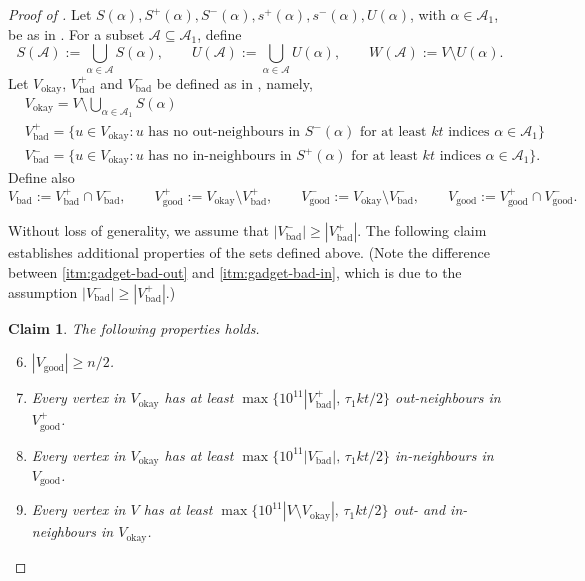 \documentclass[english]{article}
\theoremstyle{plain}
\newtheorem{claim}[theorem]{Claim}
\theoremstyle{remark}
\def \Sp {S^+}
\def \Sm {S^-}
\def \sp {s^+}
\def \smm {s^-}
\def \Vgp {V_{\good}^+}
\def \Vbp {V_{\bad}^+}
\def \Vbm {V_{\bad}^-}
\def \Vgp {V_{\good}^+}
\def \Vgm {V_{\good}^-}
\def \Vo {V_{\okay}}
\def \Vg {V_{\good}}
\def \Vb {V_{\bad}}
\def \Vgm {V_{\good}^-}
\newcommand{\A}{\mathcal{A}}
\DeclareMathOperator{\bad}{bad}
\DeclareMathOperator{\good}{good}
\DeclareMathOperator{\okay}{okay}
\begin{document}
\begin{proof}[Proof of ]
	Let $S(\alpha), \Sp(\alpha), \Sm(\alpha), \sp(\alpha), \smm(\alpha), U(\alpha)$, with $\alpha \in \A_1$, be as in . For a subset $\A \subseteq \A_1$, define
	\begin{equation*}
		S(\A) := \bigcup_{\alpha \in \A} S(\alpha), \qquad U(\A) := \bigcup_{\alpha \in \A} U(\alpha), \qquad W(\A) := V \setminus U(\alpha).
	\end{equation*}
	Let $\Vo$, $\Vbp$ and $\Vbm$ be defined as in , namely,
	\begin{align*}
		& \Vo = V \setminus \bigcup_{\alpha \in \A_1} S(\alpha) \\
		& \Vbp = \{u \in \Vo : \text{$u$ has no out-neighbours in $\Sm(\alpha)$ for at least $kt$ indices $\alpha \in \A_1$}\} \\
		& \Vbm = \{u \in \Vo : \text{$u$ has no in-neighbours in $\Sp(\alpha)$ for at least $kt$ indices $\alpha \in \A_1$}\}.
	\end{align*}
	Define also 
	\begin{equation*}
		\Vb := \Vbp \cap \Vbm, \qquad \Vgp := \Vo \setminus \Vbp, \qquad \Vgm := \Vo \setminus \Vbm, \qquad \Vg := \Vgp \cap \Vgm.
	\end{equation*}

	Without loss of generality, we assume that $|\Vbm| \ge |\Vbp|$. The following claim establishes additional properties of the sets defined above. (Note the difference between \ref{itm:gadget-bad-out} and \ref{itm:gadget-bad-in}, which is due to the assumption $|\Vbm| \ge |\Vbp|$.)

	\begin{claim} \label{claim:additional-gadget-properties}
		The following properties holds.
		\begin{enumerate}[label = \rm(G\arabic*)]
			\setcounter{enumi}{5}
			\item \label{itm:gadget-size-V-good}
				$|\Vg| \ge n/2$.
			\item \label{itm:gadget-bad-out}
				Every vertex in $\Vo$ has at least $\max\{10^{11} |\Vbp|,\, \tau_1 kt/2\}$ out-neighbours in $\Vgp$.
			\item \label{itm:gadget-bad-in}
				Every vertex in $\Vo$ has at least $\max\{10^{11} |\Vbm|,\, \tau_1 kt/2\}$ in-neighbours in $\Vg$.
			\item \label{itm:gadget-not-okay}
				Every vertex in $V$ has at least $\max\{10^{11} |V \setminus \Vo|,\, \tau_1kt /2\}$ out- and in-neighbours in $\Vo$.
		\end{enumerate}
	\end{claim}


\end{proof}
\end{document}
